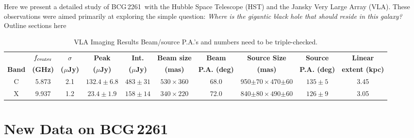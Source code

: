 \documentclass[useAMS,usenatbib]{emulateapj}
\newcommand{\src}{BCG\,2261}
\newcommand{\fixme}[1]{{\color{red} #1 }}
\begin{document}
Here we present a detailed study of \src\ with the Hubble Space Telescope (HST) and the Jansky Very Large Array (VLA). These observations were aimed primarily at exploring the simple question: \emph{Where is the gigantic black hole that should reside in this galaxy?} \fixme{Outline sections here}





\begin{table}
\centering
\caption{VLA Imaging Results \fixme{Beam/source P.A.'s and numbers need to be triple-checked.}}
\begin{tabular}{cccccccccc}
\hline
        & $f_{\rm center}$ &  {\bf $\sigma$} & {\bf Peak}        & {\bf Int.} & {\bf Beam size} & {\bf Beam} &{\bf Source Size} & {\bf Source} & {\bf Linear}\\
{\bf Band} & {\bf (GHz)} & {\bf ($\mu$Jy)}& {\bf ($\mu$Jy)} & {\bf ($\mu$Jy)} & {\bf (mas)}& {\bf P.A. (deg)} &{\bf (mas)} & {\bf P.A. (deg)} & {\bf extent (kpc)}\\
\hline
C & 5.873 & 2.1 & $132.4\pm6.8$ & $483\pm31$ &$530\times360$& 68.0 & 950$\pm$$70\times470$$\pm$60& $135\pm5$&3.45\\
X & 9.937 & 1.2 & $23.4\pm1.9$   & $158\pm14$ & $340\times220$ & 72.0& 840$\pm$$80\times490$$\pm$60& $126\pm9$&3.05\\
\hline
\end{tabular}\label{table:radio}
\vspace{1mm}
\end{table}

\section{New Data on \src}\label{sec:data}
\end{document}

